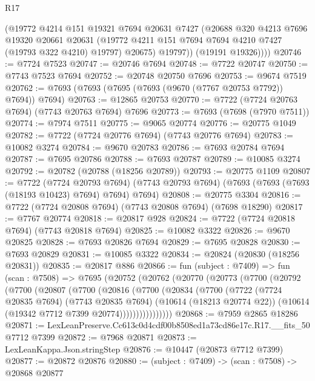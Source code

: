 \begin{lexlean}{R17}
\begin{coremodule}
            (@19772
              @4214
              @151
              @19321
              @7694
              @20631
              @7427
              (@20688
                @320
                @4213
                @7696
                @19320
                @20661
                @20631
                (@19772 @4211 @151 @7694 @7694 @4210 @7427 (@19793 @322 @4210) @19797)
                @20675)
              @19797))
          (@19191 @19326))))
@20746 := @7724 @7523
@20747 := @20746 @7694
@20748 := @7722 @20747
@20750 := @7743 @7523 @7694
@20752 := @20748 @20750 @7696
@20753 := @9674 @7519
@20762 := @7693 (@7693 (@7695 (@7693 (@9670 (@7767 @20753 @7792)) @7694)) @7694)
@20763 := @12865 @20753
@20770 := @7722 (@7724 @20763 @7694) (@7743 @20763 @7694) @7696
@20773 := @7693 (@7698 (@7970 @7511))
@20774 := @7974 @7511
@20775 := @9065 @20774
@20776 := @20775 @1049
@20782 := @7722 (@7724 @20776 @7694) (@7743 @20776 @7694)
@20783 := @10082 @3274
@20784 := @9670 @20783
@20786 := @7693 @20784 @7694
@20787 := @7695 @20786
@20788 := @7693 @20787
@20789 := @10085 @3274
@20792 := @20782 (@20788 (@18256 @20789))
@20793 := @20775 @1109
@20807 := @7722
    (@7724 @20793 @7694)
    (@7743 @20793 @7694)
    (@7693 (@7693 (@7693 (@18193 @10423) @7694) @7694) @7694)
@20808 := @20775 @3304
@20816 := @7722 (@7724 @20808 @7694) (@7743 @20808 @7694) (@7698 @18290)
@20817 := @7767 @20774
@20818 := @20817 @928
@20824 := @7722 (@7724 @20818 @7694) (@7743 @20818 @7694)
@20825 := @10082 @3322
@20826 := @9670 @20825
@20828 := @7693 @20826 @7694
@20829 := @7695 @20828
@20830 := @7693 @20829
@20831 := @10085 @3322
@20834 := @20824 (@20830 (@18256 @20831))
@20835 := @20817 @886
@20866 := fun (subject : @7409) =>
  fun (scan : @7508) =>
  @7695
    (@20752
      (@20762
        (@20770
          (@20773
            (@7700
              (@20792
                (@7700
                  (@20807
                    (@7700
                      (@20816
                        (@7700
                          (@20834
                            (@7700
                              (@7722
                                (@7724 @20835 @7694)
                                (@7743 @20835 @7694)
                                (@10614 (@18213 @20774 @22))
                                (@10614 (@19342 @7712 @7399 @20774))))))))))))))))
@20868 := @7959 @2865 @18286
@20871 := LexLeanPreserve.Cc613c0d4cdf00b8508ed1a73cd86e17c.R17.__fits_50 @7712 @7399
@20872 := @7968 @20871
@20873 := LexLeanKappa.Json.stringStep
@20876 := @10447 (@20873 @7712 @7399)
@20877 := @20872 @20876
@20880 := (subject : @7409) -> (scan : @7508) -> @20868 @20877

\end{coremodule}
\end{lexlean}
